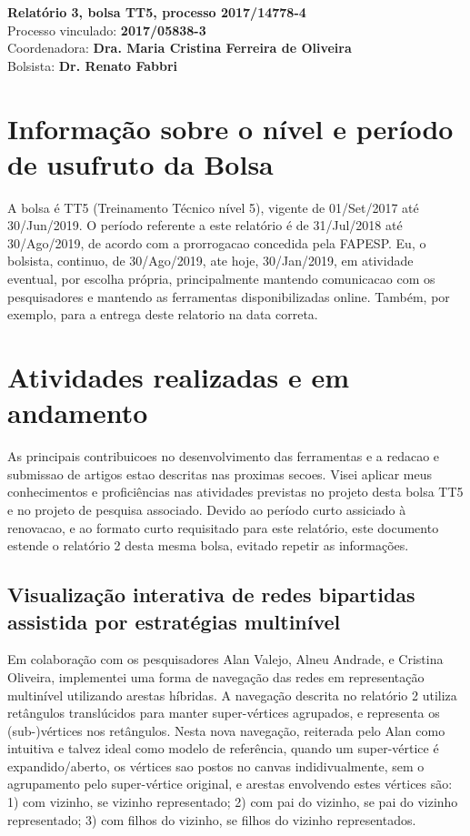 \documentclass[a4paper, 11pt]{article}
\begin{document}
\noindent
\normalsize
 \textbf{Relatório 3, bolsa TT5, processo 2017/14778-4}\\
Processo vinculado: \textbf{2017/05838-3} \\
Coordenadora: \textbf{Dra. Maria Cristina Ferreira de Oliveira} \\
Bolsista: \textbf{Dr. Renato Fabbri}

\section{Informação sobre o nível e período de usufruto da Bolsa}
A bolsa é TT5 (Treinamento Técnico nível 5), vigente de 01/Set/2017 até 30/Jun/2019.
O período referente a este relatório é de 31/Jul/2018 até 30/Ago/2019,
de acordo com a prorrogacao concedida pela FAPESP.
Eu, o bolsista, continuo, de 30/Ago/2019, ate hoje, 30/Jan/2019, em atividade eventual, 
por escolha própria, principalmente mantendo comunicacao com os pesquisadores e
mantendo as ferramentas disponibilizadas online.
Também, por exemplo, para a entrega deste relatorio na data correta.

\section{Atividades realizadas e em andamento}\label{desc}
As principais contribuicoes no desenvolvimento das ferramentas
e a redacao e submissao de artigos estao descritas nas proximas secoes.
Visei aplicar meus conhecimentos e proficiências nas atividades previstas no projeto desta bolsa TT5
e no projeto de pesquisa associado.
Devido ao período curto assiciado à renovacao, e ao formato curto requisitado
para este relatório, este documento estende o relatório 2
desta mesma bolsa, evitado repetir as informações.

\subsection{Visualização interativa de redes bipartidas assistida por estratégias multinível}\label{sml}
Em colaboração com os pesquisadores Alan Valejo, Alneu Andrade, e Cristina Oliveira,
implementei uma forma de navegação das redes em representação multinível
utilizando arestas híbridas. A navegação descrita no relatório 2 utiliza retângulos translúcidos
para manter super-vértices agrupados, e representa os (sub-)vértices nos retângulos.
Nesta nova navegação, reiterada pelo Alan como intuitiva e talvez ideal como modelo de referência,
quando um super-vértice é expandido/aberto, os vértices sao postos no canvas indidivualmente, sem
o agrupamento pelo super-vértice original, e arestas envolvendo estes vértices são:
1) com vizinho, se vizinho representado;
2) com pai do vizinho, se pai do vizinho representado;
3) com filhos do vizinho, se filhos do vizinho representados.
\end{document}
